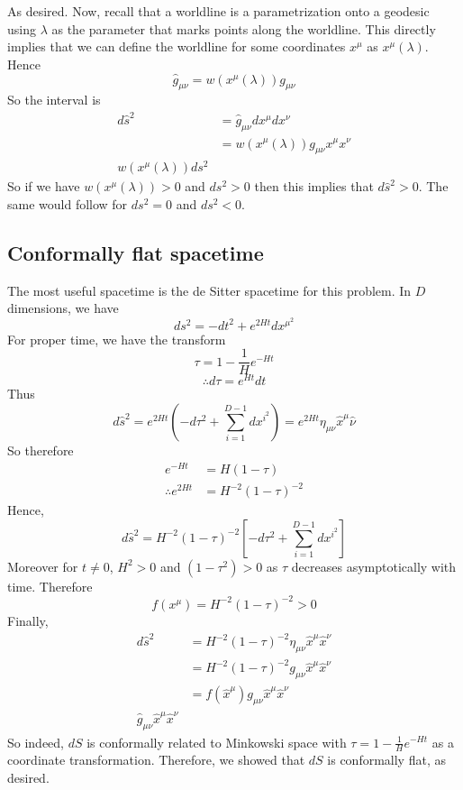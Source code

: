 \documentclass{article}
\begin{document}
			As desired. Now, recall that a worldline is a parametrization onto a geodesic using $\lambda$ as the parameter that marks points along the worldline. This directly implies that we can define the worldline for some coordinates $x^\mu$ as $x^\mu (\lambda)$. Hence
			$$ \hat g_{\mu\nu} = w \left( x^\mu \left( \lambda\right)\right) g_{\mu\nu}$$
			So the interval is
			\begin{align*}
				d\hat s^2 &= \hat g_{\mu\nu} dx^\mu dx^\nu \\
				&= w \left( x^\mu \left( \lambda\right)\right) g_{\mu\nu} x^\mu x^\nu \\
				w \left( x^\mu \left( \lambda\right)\right) ds^2
			\end{align*}
			So if we have $	w \left( x^\mu \left( \lambda\right)\right) > 0$ and $ds^2 > 0$ then this implies that $d\hat s^2 >0$. The same would follow for $ds^2 = 0$ and $ds^2 < 0$.
			
		\pagebreak
		\subsection{Conformally flat spacetime}
			The most useful spacetime is the de Sitter spacetime for this problem. In $D$ dimensions, we have
			$$ ds^2 = -dt^2 + e^{2Ht} dx^{\mu^2}$$
			For proper time, we have the transform
			$$ \tau = 1 - \frac{1}{H} e^{-Ht}$$
			$$ \therefore d\tau = e^{Ht}dt$$
			Thus
			$$ d\hat s^2 = e^{2Ht} \left( -d\tau^2 + \sum_{i=1}^{D-1} dx^{i^2} \right) = e^{2Ht} \eta_{\mu\nu} \hat{x}^\mu \hat{\nu}$$
			So therefore
			\begin{align*}
				e^{-Ht} &= H(1-\tau) \\
				\therefore e^{2Ht} &= H^{-2} (1-\tau)^{-2}
			\end{align*}
			Hence,
			$$ d \hat s ^2 = H^{-2}(1-\tau)^{-2} \left[ -d\tau^2 + \sum_{i=1}^{D-1} dx^{i^2} \right]$$
			Moreover for $t\neq0$, $H^2 > 0$ and $ (1-\tau^2)> 0$ as $\tau$ decreases asymptotically with time. Therefore
			$$ f(x^\mu) = H^{-2} (1-\tau)^{-2} >0$$
			Finally,
			\begin{align*}
				d\hat s^2 &= H^{-2} (1-\tau)^{-2} \eta_{\mu\nu} \hat{x}^\mu \hat x^\nu \\
				&= H^{-2} (1-\tau)^{-2} g_{\mu\nu} \hat x^\mu \hat x^\nu \\
				&= f\left(\hat x ^\mu \right) g_{\mu\nu} \hat x^\mu \hat x^\nu \\
				\hat g_{\mu\nu} \hat x^\mu \hat x^\nu
			\end{align*}
			So indeed, $dS$ is conformally related to Minkowski space with $\tau = 1 - \frac{1}{H}e^{-Ht}$ as a coordinate transformation. Therefore, we showed that $dS$ is conformally flat, as desired.
\end{document}

